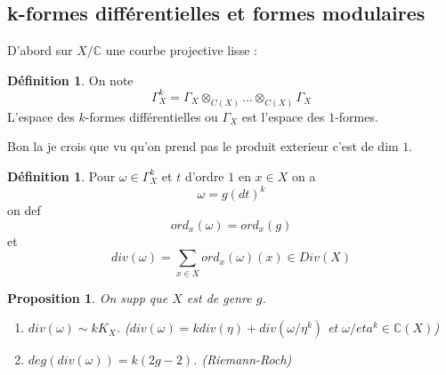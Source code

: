 \documentclass[12pt]{article}
\theoremstyle{plain}
\newtheorem{prop}[subsubsection]{Proposition}
\theoremstyle{definition}
\newtheorem{defn}[subsubsection]{D\'efinition}
\theoremstyle{remark}
\newcommand{\C}{\mathbb{C}}
\newcommand{\w}{\omega}
\begin{document}
\subsection{k-formes différentielles et formes modulaires}
D'abord sur $X/\C$ une courbe projective lisse :
\begin{defn}
    On note $$\Gamma_{X}^k=\Gamma_X\otimes_{C(X)}...\otimes_{C(X)}\Gamma_X$$ L'espace des $k$-formes différentielles ou $\Gamma_X$ est l'espace
    des $1$-formes.
\end{defn}
Bon la je crois que vu qu'on prend pas le produit exterieur c'est de dim $1$.
\begin{defn}
    Pour $\w\in\Gamma_X^k$ et $t$ d'ordre $1$ en $x\in X$ on a $$\w=g(dt)^k$$
    on def $$ord_x(\w)=ord_x(g)$$
    et $$div(\w)=\sum_{x\in X}ord_x(\w)(x)\in Div(X)$$
\end{defn}

\begin{prop}
    On supp que $X$ est de genre $g$.\begin{enumerate}
        \item $div(\w)\sim kK_X$. ($div(\w)=kdiv(\eta)+div(\w/\eta^k)$ et $\w/eta^k\in \C(X)$)
        \item $deg(div(\w))=k(2g-2)$. (Riemann-Roch)
    \end{enumerate}
\end{prop}
\end{document}
